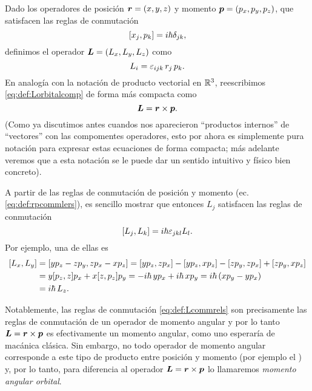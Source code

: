\documentclass[10pt, a4paper]{article}
\numberwithin{equation}{subsection}
\begin{document}
Dado los operadores de posición $\vb*{r} = \left(x, y, z\right)$ y momento
$\vb*{p} = \left(p_x, p_y, p_z\right)$, que satisfacen las reglas de
conmutación
\begin{equation} \label{eq:def:rpcommlers}
  \comm{x_j}{p_k} = i\hbar\delta_{jk},
\end{equation}
definimos el operador $\vb*{L} = \left(L_x, L_y, L_z\right)$ como
\begin{equation} \label{eq:def:Lorbitalcomp}
  L_i = \varepsilon_{ijk}\,r_j\,p_k.
\end{equation}
En analogía con la notación de producto vectorial en $\mathbb{R}^3$, reescribimos
\eqref{eq:def:Lorbitalcomp} de forma más compacta como
\begin{equation} \label{eq:def:Lorbitalvect}
  \vb*{L} = \vb*{r}\times\vb*{p}.
\end{equation}
(Como ya discutimos antes cuandos nos aparecieron ``productos internos'' de
``vectores'' con las compomentes operadores, esto por ahora es simplemente pura
notación para expresar estas ecuaciones de forma compacta; más adelante veremos
que a esta notación se le puede dar un sentido intuitivo y físico bien
concreto).

A partir de las reglas de conmutación de posición y momento (ec.
\eqref{eq:def:rpcommlers}), es sencillo mostrar que entonces $L_j$ satisfacen
las reglas de conmutación
\begin{equation} \label{eq:def:Lcommrels}
  \comm{L_j}{L_k} = i\hbar\lchivita_{jkl}L_l.
\end{equation}
Por ejemplo, una de ellas es
\begin{align}
  \comm{L_x}{L_y} &= \comm{yp_z - zp_y}{zp_x - xp_z} = \comm{yp_z}{zp_x} -
    \comm{yp_z}{xp_z} - \comm{zp_y}{zp_x} + \comm{zp_y}{xp_z} \nonumber \\
  &= y\comm{p_z}{z}p_x + x\comm{z}{p_z}p_y
    = -i\hbar\,yp_x + i\hbar\,xp_y = i\hbar\left(xp_y - yp_x\right)
    \\ \nonumber
  &= i\hbar\,L_z.
\end{align}

Notablemente, las reglas de conmutación \eqref{eq:def:Lcommrels} son
precisamente las reglas de conmutación de un operador de momento angular y por
lo tanto $\vb*{L} = \vb*{r}\times\vb*{p}$ es efectivamente un momento
angular, como uno esperaría de macánica clásica. Sin embargo, no todo operador
de momento angular corresponde a este tipo de producto entre posición y
momento (por ejemplo el \spin)  y, por lo tanto, para diferencia al operador
$\vb*{L} = \vb*{r}\times\vb*{p}$ lo llamaremos \emph{momento angular
orbital}.
\end{document}
